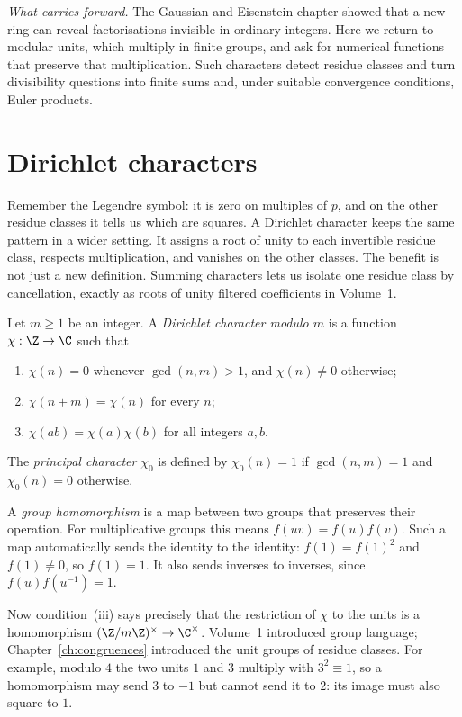 \noindent\emph{What carries forward.} The Gaussian and Eisenstein chapter showed that a new ring can reveal factorisations invisible in ordinary integers. Here we return to modular units, which multiply in finite groups, and ask for numerical functions that preserve that multiplication. Such characters detect residue classes and turn divisibility questions into finite sums and, under suitable convergence conditions, Euler products.

\section{Dirichlet characters}

Remember the Legendre symbol: it is zero on multiples of $p$, and on the other residue classes it tells us which are squares. A Dirichlet character keeps the same pattern in a wider setting. It assigns a root of unity to each invertible residue class, respects multiplication, and vanishes on the other classes. The benefit is not just a new definition. Summing characters lets us isolate one residue class by cancellation, exactly as roots of unity filtered coefficients in Volume~1.

\begin{definition}\label{def:t1-character}
Let $m\ge1$ be an integer. A \emph{Dirichlet character modulo $m$} is a function $\chi:\Z\to\C$ such that
\begin{enumerate}[label=(\roman*)]
\item $\chi(n)=0$ whenever $\gcd(n,m)>1$, and $\chi(n)\ne0$ otherwise;
\item $\chi(n+m)=\chi(n)$ for every $n$;
\item $\chi(ab)=\chi(a)\chi(b)$ for all integers $a,b$.
\end{enumerate}
The \emph{principal character} $\chi_0$ is defined by $\chi_0(n)=1$ if $\gcd(n,m)=1$ and $\chi_0(n)=0$ otherwise.
\end{definition}

A \emph{group homomorphism} is a map between two groups that preserves their operation. For multiplicative groups this means $f(uv)=f(u)f(v)$. Such a map automatically sends the identity to the identity: $f(1)=f(1)^2$ and $f(1)\ne0$, so $f(1)=1$. It also sends inverses to inverses, since $f(u)f(u^{-1})=1$.

Now condition~(iii) says precisely that the restriction of $\chi$ to the units is a homomorphism $(\Z/m\Z)^\times\to\C^\times$. Volume~1 introduced group language; Chapter~\ref{ch:congruences} introduced the unit groups of residue classes. For example, modulo $4$ the two units $1$ and $3$ multiply with $3^2\equiv1$, so a homomorphism may send $3$ to $-1$ but cannot send it to $2$: its image must also square to $1$.

